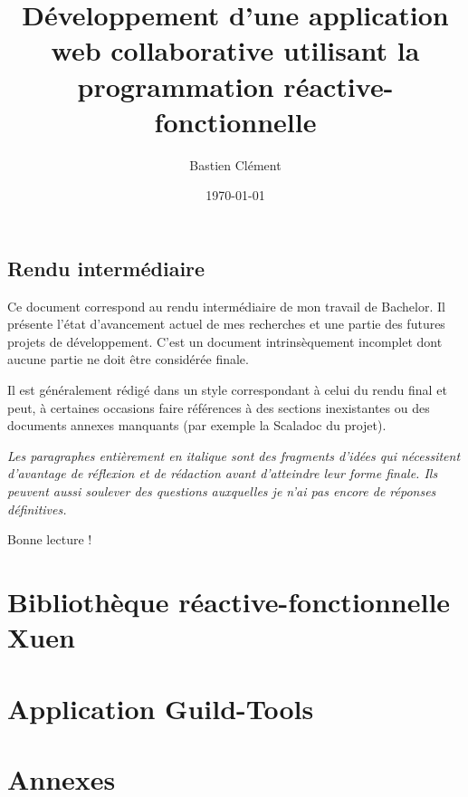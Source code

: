 \documentclass[11pt, a4paper, twoside, frenchb]{book}
\title{Développement d'une application web collaborative utilisant la programmation réactive-fonctionnelle}
\author{Bastien Clément}
\date{\today}
\begin{document}
\frontmatter
\maketitle

\chapter*{Rendu intermédiaire}
Ce document correspond au rendu intermédiaire de mon travail de Bachelor. Il présente l'état d'avancement actuel de mes recherches et une partie des futures projets de développement. C'est un document intrinsèquement incomplet dont aucune partie ne doit être considérée finale.

Il est généralement rédigé dans un style correspondant à celui du rendu final et peut, à certaines occasions faire références à des sections inexistantes ou des documents annexes manquants (par exemple la Scaladoc du projet).

\textit{Les paragraphes entièrement en italique sont des fragments d'idées qui nécessitent d'avantage de réflexion et de rédaction avant d'atteindre leur forme finale. Ils peuvent aussi soulever des questions auxquelles je n'ai pas encore de réponses définitives. }

Bonne lecture !

\tableofcontents

\mainmatter


\part[Bibliothèque réactive-fonctionnelle]{Bibliothèque réactive-fonctionnelle \\
	\vspace{1cm} {\normalfont Xuen}}


%
%
%

\part{Application Guild-Tools}


\backmatter
\part{Annexes}



\end{document}
